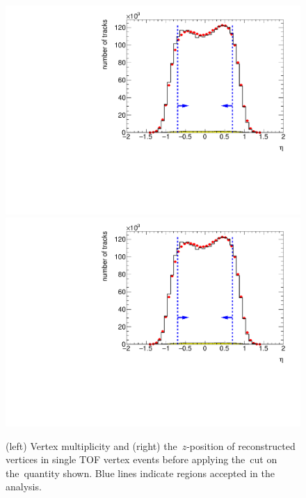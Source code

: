 \begin{figure}[b!]
	\centering
	\includegraphics[width=.49\textwidth, page=13]{chapters/chrgSTAR/img/selection/SDT.pdf}
	\includegraphics[width=.49\textwidth, page=7]{chapters/chrgSTAR/img/selection/SDT.pdf}
	\caption{(left) Vertex multiplicity  and  (right) the~$z$-position of  reconstructed vertices in single TOF vertex events before applying  the~cut on the~quantity shown. Blue lines indicate regions accepted in the analysis.}
	\label{fig:vertexSTAR}
\end{figure}

